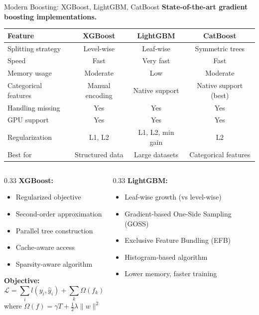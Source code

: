 \begin{frame}{Modern Boosting: XGBoost, LightGBM, CatBoost}
\textbf{State-of-the-art gradient boosting implementations.}

\begin{table}
\centering
\small
\begin{tabular}{lccc}
\toprule
\textbf{Feature} & \textbf{XGBoost} & \textbf{LightGBM} & \textbf{CatBoost} \\
\midrule
Splitting strategy & Level-wise & Leaf-wise & Symmetric trees \\
Speed & Fast & Very fast & Fast \\
Memory usage & Moderate & Low & Moderate \\
Categorical features & Manual encoding & Native support & Native support (best) \\
Handling missing & Yes & Yes & Yes \\
GPU support & Yes & Yes & Yes \\
Regularization & L1, L2 & L1, L2, min gain & L2 \\
Best for & Structured data & Large datasets & Categorical features \\
\bottomrule
\end{tabular}
\end{table}

\begin{columns}
\begin{column}{0.33\textwidth}
\textbf{XGBoost:}
\begin{itemize}
\item Regularized objective
\item Second-order approximation
\item Parallel tree construction
\item Cache-aware access
\item Sparsity-aware algorithm
\end{itemize}

\textbf{Objective:}
\[\mathcal{L} = \sum_i l(y_i, \hat{y}_i) + \sum_k \Omega(f_k)\]
where $\Omega(f) = \gamma T + \frac{1}{2}\lambda \|w\|^2$
\end{column}
\begin{column}{0.33\textwidth}
\textbf{LightGBM:}
\begin{itemize}
\item Leaf-wise growth (vs level-wise)
\item Gradient-based One-Side Sampling (GOSS)
\item Exclusive Feature Bundling (EFB)
\item Histogram-based algorithm
\item Lower memory, faster training
\end{itemize}


\end{column}
\end{columns}
\end{frame}
